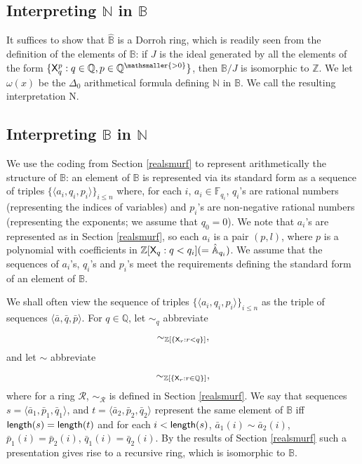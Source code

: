 \documentclass{amsart}
\renewcommand{\leq}{\leqslant}
\newcommand{\mc}[1]{\mathcal #1}
\newcommand{\X}{{\sf X}}
\newcommand{\QS}{\mathbb{B}}
\begin{document}
\subsection{Interpreting $\mathbb{N}$ in $\mathbb{B}$}
It suffices to show that $\hat{\mathbb{B}}$ is a Dorroh ring, which is 
readily seen from the definition of the elements of $\mathbb{B}$: if $J$ is the ideal generated by all the elements of the form $\{\X_q^p : q\in\mathbb{Q}, p\in \mathbb{Q}^{\mathsmaller{> 0}}\}$, then $\mathbb{B}/J$ is isomorphic to $\mathbb{Z}.$ We let $\omega(x)$ be the $\Delta_0$ arithmetical formula defining $\mathbb{N}$ in $\mathbb{B}$. We call the resulting interpretation {\sf N}.

\subsection{Interpreting $\QS$ in $\mathbb{N}$}
We use the coding from Section \ref{realsmurf} to represent arithmetically the structure of $\QS$: an element of $\QS$ 
is represented via its standard form as a sequence of triples 
$\{\langle a_i, q_i, p_i\rangle\}_{i\leq n}$ where,  for each $i$, 
$a_i\in \mathbb{F}_{q_i}$,
 $q_i$'s are rational numbers (representing the indices of variables) and $p_i$'s are non-negative rational numbers (representing the exponents; we assume that $q_0 = 0$). We note that $a_i$'s are represented as in Section \ref{realsmurf}, so each $a_i$ is a pair $(p,l)$, where $p$ is a polynomial with coefficients in $\mathbb{Z}[\X_q:q<q_i] (= \hat{\mathbb{A}}_{q_i})$.  We assume that the sequences of $a_i$'s, $q_i$'s and $p_i$'s meet the requirements defining the standard form of an element of $\mathbb{B}$. 

We shall often view the sequence of triples $\{\langle a_i, q_i, p_i\rangle\}_{i\leq n}$ as the triple of sequences $\langle \bar{a},\bar{q},\bar{p}\rangle$. For $q\in\mathbb{Q}$, let 
$\sim_q$ abbreviate $$\sim_{\mathbb{Z}[\{\X_r:r<q\}]},$$and let 
$\sim$ abbreviate $$\sim_{\mathbb{Z}[\{\X_r:r\in\mathbb{Q}\}]},$$ 
where for a ring $\mc R$, $\sim_{\mc R}$ is defined in Section \ref{realsmurf}.  We say that sequences $s=\langle \bar{a}_1,\bar{p}_1,\bar{q}_1\rangle$, and $t=\langle \bar{a}_2, \bar{p}_2, \bar{q}_2\rangle$ represent the same element of $\mathbb{B}$ iff ${\sf length}(s) = {\sf length}(t)$ and for each $i<{\sf length}(s)$, $\bar{a}_1(i)\sim \bar{a}_2(i)$, $\bar{p}_1(i) = \bar{p}_2(i)$, $\bar{q}_1(i) = \bar{q}_2(i)$. By the results of Section \ref{realsmurf} such a presentation gives rise to a recursive ring, which is isomorphic to $\mathbb{B}$.
\end{document}
